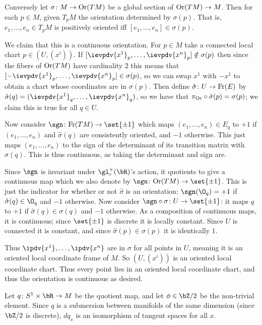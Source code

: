     Conversely let $\sigma\colon M\to{\rm Or}(TM)$ be a global section of ${\rm Or}(TM)\to M$.
    Then for each $p\in M$, given $T_pM$ the orientation determined by $\sigma(p)$.
    That is, $e_1,\dots,e_n\in T_pM$ is positively oriented iff $[e_1,\dots,e_n]\in\sigma(p)$.
    
    We claim that this is a continuous orientation.
    For $p\in M$ take a connected local chart $p\in(U,(x^i))$.
    If $[\ievpdv{x^1}_p,\dots,\ievpdv{x^n}_p]\notin\sigma(p)$ then since the fibers of ${\rm Or}(TM)$ have cardinality $2$
    this means that $[-\ievpdv{x^1}_p,\dots,\ievpdv{x^n}_p]\in\sigma(p)$, so we can swap $x^1$ with $-x^1$ to obtain a chart whose coordinates are in $\sigma(p)$.
    Then define $\hat\sigma\colon U\to{\rm Fr}(E)$ by $\hat\sigma(q)=(\ievpdv{x^1}_q,\dots,\ievpdv{x^n}_q)$, so we have that $\pi_{\rm Or}\circ\hat\sigma(p)=\sigma(p)$; we claim this is true for all $q\in U$.

    Now consider $\sgn\colon\Fr(TM)\to\set{\pm1}$ which maps $(e_1,\dots,e_n)\in E_q$ to $+1$ if $(e_1,\dots,e_n)$ and $\hat\sigma(q)$ are consistently oriented, and $-1$ otherwise.
    This just maps $(e_1,\dots,e_n)$ to the sign of the determinant of its transition matrix with $\hat\sigma(q)$.
    This is thus continuous, as taking the determinant and sign are.

    Since $\sgn$ is invariant under $\gl_r^+(\bR)$'s action, it quotients to give a continuous map which we also denote by $\sgn\colon\Or(TM)\to\set{\pm1}$.
    This is just the indicator for whether or not $\hat\sigma$ is an orientation: $\sgn(\O_q)=+1$ if $\hat\sigma(q)\in\O_q$ and $-1$ otherwise.
    Now consider $\sgn\circ\sigma\colon U\to\set{\pm1}$: it maps $q$ to $+1$ if $\hat\sigma(q)\in\sigma(q)$ and $-1$ otherwise.
    As a composition of continuous maps, it is continuous; since $\set{\pm1}$ is discrete it is locally constant.
    Since $U$ is connected it is constant, and since $\hat\sigma(p)\in\sigma(p)$ it is identically $1$.

    Thus $\ipdv{x^1},\dots,\ipdv{x^n}$ are in $\sigma$ for all points in $U$, meaning it is an oriented local coordinate frame of $M$.
    So $(U,(x^i))$ is an oriented local coordinate chart.
    Thus every point lies in an oriented local coordinate chart, and thus the orientation is continuous as desired.

    \item Let $q\colon S^1\times\bR\to M$ be the quotient map, and let $\phi\in\bZ/2$ be the non-trivial element.
    Since $q$ is a submersion between manifolds of the same dimension (since $\bZ/2$ is discrete), $dq_x$ is an isomorphism of tangent spaces for all $x$.

